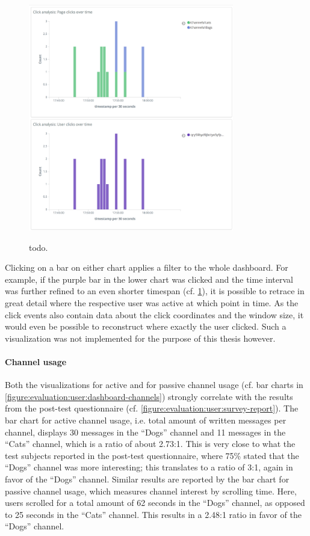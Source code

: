 \begin{figure}[h]
        \caption{todo.}
        \includegraphics[width=0.8\textwidth]{gfx/dashboard-clicks-zoom-user.png}
        \label{figure:evaluation:user:dashboard-clicks-zoom-user}
\end{figure}

Clicking on a bar on either chart applies a filter to the whole dashboard.
For example, if the purple bar in the lower chart was clicked and the time interval was further refined to an even shorter timespan (cf. \cref{figure:evaluation:user:dashboard-clicks-zoom-user}), it is possible to retrace in great detail where the respective user was active at which point in time.
As the click events also contain data about the click coordinates and the window size, it would even be possible to reconstruct where exactly the user clicked.
Such a visualization was not implemented for the purpose of this thesis however.

\paragraph{Channel usage}

Both the visualizations for active and for passive channel usage (cf. bar charts in \cref{figure:evaluation:user:dashboard-channels}) strongly correlate with the results from the post-test questionnaire (cf. \cref{figure:evaluation:user:survey-report}).
The bar chart for active channel usage, i.e. total amount of written messages per channel, displays 30 messages in the ``Dogs'' channel and 11 messages in the ``Cats'' channel, which is a ratio of about 2.73:1.
This is very close to what the test subjects reported in the post-test questionnaire, where 75\% stated that the ``Dogs'' channel was more interesting; this translates to a ratio of 3:1, again in favor of the ``Dogs'' channel.
Similar results are reported by the bar chart for passive channel usage, which measures channel interest by scrolling time.
Here, users scrolled for a total amount of 62 seconds in the ``Dogs'' channel, as opposed to 25 seconds in the ``Cats'' channel.
This results in a 2.48:1 ratio in favor of the ``Dogs'' channel.

